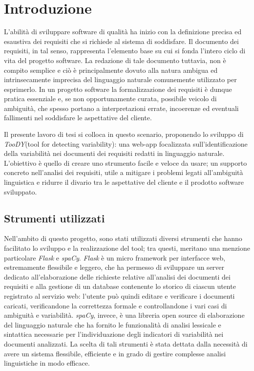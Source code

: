 \documentclass[12pt]{report}
\newcommand{\toody}{\textsl{TooDY}\xspace}
\newcommand{\flask}{\textsl{Flask}\xspace}
\newcommand{\spacy}{\textsl{spaCy}\xspace}
\begin{document}
\chapter{Introduzione}
L’abilità di sviluppare software di qualità ha inizio con la definizione precisa ed esaustiva dei requisiti che si richiede al sistema di soddisfare. Il documento dei requisiti, in tal senso, rappresenta l'elemento base su cui si fonda l’intero ciclo di vita del progetto software. La redazione di tale documento tuttavia, non è compito semplice e ciò è principalmente dovuto alla natura ambigua ed intrinsecamente imprecisa del linguaggio naturale comunemente utilizzato per esprimerlo. In un progetto software la formalizzazione dei requisiti è dunque pratica essenziale e, se non opportunamente curata, possibile veicolo di ambiguità, che spesso portano a interpretazioni errate, incoerenze ed eventuali fallimenti nel soddisfare le aspettative del cliente.

Il presente lavoro di tesi si colloca in questo scenario, proponendo lo sviluppo di \toody (tool for detecting variability): una web-app focalizzata sull’identificazione della variabilità nei documenti dei requisiti redatti in linguaggio naturale. L’obiettivo è quello di creare uno strumento facile e veloce da usare; un supporto concreto nell’analisi dei requisiti, utile a mitigare i problemi legati all’ambiguità linguistica e ridurre il divario tra le aspettative del cliente e il prodotto software sviluppato.


\section{Strumenti utilizzati}
Nell’ambito di questo progetto, sono stati utilizzati diversi strumenti che hanno facilitato lo sviluppo e la realizzazione del tool; tra questi, meritano una menzione particolare \flask e \spacy. \flask è un micro framework per interfacce web, estremamente flessibile e leggero, che ha permesso di sviluppare un server dedicato all’elaborazione delle richieste relative all’analisi dei documenti dei requisiti e alla gestione di un database contenente lo storico di ciascun utente registrato al servizio web: l'utente può quindi editare e verificare i documenti caricati, verificandone la correttezza formale e controllandone i vari casi di ambiguità e variabilità. \spacy, invece, è una libreria open source di elaborazione del linguaggio naturale che ha fornito le funzionalità di analisi lessicale e sintattica necessarie per l’individuazione degli indicatori di variabilità nei documenti analizzati. La scelta di tali strumenti è stata dettata dalla necessità di avere un sistema flessibile, efficiente e in grado di gestire complesse analisi linguistiche in modo efficace.
\end{document}
